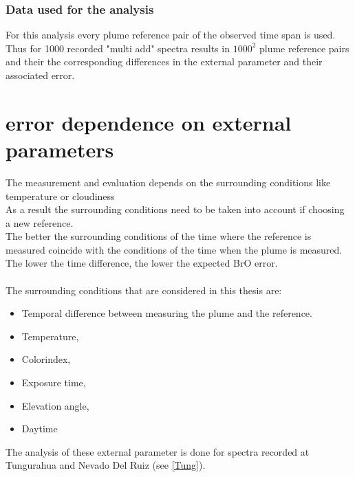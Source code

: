 \documentclass  [
  paper    = a4,
  BCOR     = 10mm,
  twoside,
  fontsize = 12pt,
  fleqn,
  toc      = bibnumbered,
  toc      = listofnumbered,
  numbers  = noendperiod,
  headings = normal,
  listof   = leveldown,
  version  = 3.03
]                                       {scrreprt}
\begin{document}
	\subsubsection*{Data used for the analysis}
	For this analysis every plume reference pair of the observed time span is used. Thus for 1000 recorded "multi add" spectra results in $1000^2$ plume reference pairs and their the corresponding differences in the external parameter and their associated  error.

	\section{ error dependence on external parameters \label{Chap:BROErr}}
	The measurement and evaluation depends on the surrounding conditions like temperature or cloudiness \citep{lubcke2014optical}\\
	As a result the surrounding conditions need to be taken into account if choosing a new reference.\\
	The better the surrounding conditions of the time where the reference is measured coincide with the conditions of the time when the plume is measured. The lower the time difference, the lower the expected BrO error.  \\
	\\

	The surrounding conditions that are considered in this thesis are: 
	\begin{itemize}
		\item Temporal difference between measuring the plume and the reference.
		\item Temperature, 
		\item Colorindex, 
		\item Exposure time, 
		\item Elevation angle, 
		\item Daytime 	
	\end{itemize}
	The analysis of these external parameter is done for spectra recorded at Tungurahua and Nevado Del Ruiz (see \cref{Tung}). 
	
	
	
	
\end{document}
